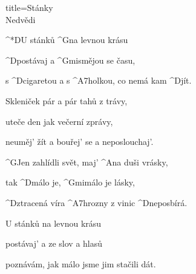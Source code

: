 \begin{song}{title=\predtitle\centering Stánky \\\large Nedvědi \vspace*{-0.3cm}}  %
\begin{centerjustified}
\nejnejvetsi

\sloka
	^*{D}U\: stánků ^{G}na levnou krásu

	^{D\z}postávaj a ^{Gmi\z}smějou se času,

	s ^{D\z}cigaretou a s ^{A7\z}holkou, co nemá kam ^{D}jít.

\sloka
	Skleniček pár a pár tahů z trávy,

	uteče den jak večerní zprávy,

	neuměj' žít a bouřej' se a neposlouchaj'.

	^{G}Jen zahlídli svět, maj' ^{A}na duši vrásky,

	tak ^{D\z}málo je, ^{Gmi}málo je lásky,

	^{D\z}ztracená víra ^{A7\z}hrozny z vinic ^{{\z}D}neposbírá.

\sloka
	U stánků na levnou krásu
   	
   	postávaj' a ze slov a hlasů
   	
   	poznávám, jak málo jsme jim stačili dát.




\end{centerjustified}
\setcounter{Slokočet}{0}
\end{song}
